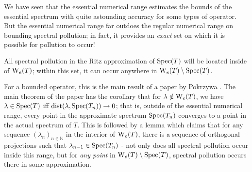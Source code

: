 \documentclass[../main.tex]{subfiles}
\begin{document}
We have seen that the essential numerical range estimates the bounds of the essential spectrum with quite astounding accuracy for some types of
operator. But the essential numerical range far outdoes the regular numerical range on bounding spectral pollution; in fact, it provides an \emph{exact}
set on which it is possible for pollution to occur! 

\begin{theorem}
All spectral pollution in the Ritz approximation of $\mathrm{Spec}(T)$ will be located inside of $\mathrm{W}_e(T)$; within this set, it can occur anywhere in $\mathrm{W}_e(T) \setminus \mathrm{Spec}(T)$.
\end{theorem}

For a bounded operator, this is the main result of a paper by Pokrzywa \parencite{pokrzywa1979method}. The main theorem of the paper has the
corollary that for $\lambda \notin \mathrm{W}_e(T)$, we have $\lambda \in \mathrm{Spec}(T)$ iff $\text{dist}(\lambda, \mathrm{Spec}(T_n)) \rightarrow 0$; that is, outside of the
essential numerical range, every point in the approximate spectrum $\mathrm{Spec}(T_n)$ converges to a point in the actual spectrum of $T$. This is followed by
a lemma which claims that for any sequence $(\lambda_n)_{n \in \mathbb{N}}$ in the interior of $\mathrm{W}_e(T)$, there is a sequence of orthogonal projections such that $\lambda_{n-1} \in \mathrm{Spec}(T_n)$ - not only does all spectral pollution occur inside this range, but for \emph{any point} in 
$\mathrm{W}_e(T) \setminus \mathrm{Spec}(T)$, spectral pollution occurs there in some approximation.
\end{document}
